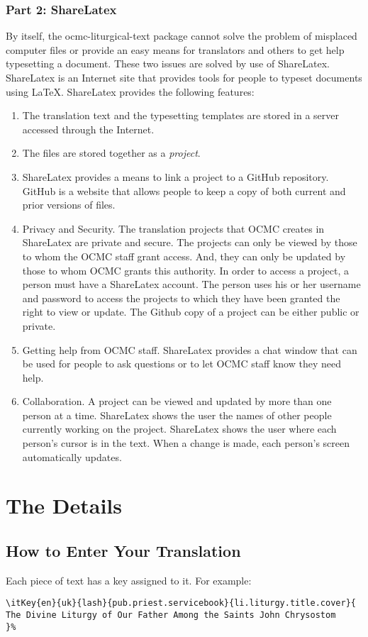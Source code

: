\documentclass[]{memoir}
\begin{document}
\subsection{Part 2: ShareLatex}
By itself, the ocmc-liturgical-text package cannot solve the problem of misplaced computer files or provide an easy means for translators and others to get help typesetting a document.  These two issues are solved by use of ShareLatex.  ShareLatex is an Internet site that provides tools for people to typeset documents using \LaTeX. ShareLatex provides the following features:
\begin{enumerate}
    \item The translation text and the typesetting templates are stored in a server accessed through the Internet.
    \item The files are stored together as a \textit{project}.
    \item ShareLatex provides a means to link a project to a GitHub repository.  GitHub is a website that allows people to keep a copy of both current and prior versions of files.  
    \item Privacy and Security.  The translation projects that OCMC creates in ShareLatex are private and secure.  The projects can only be viewed by those to whom the OCMC staff grant access.  And, they can only be updated by those to whom OCMC grants this authority. In order to access a project, a person must have a ShareLatex account.  The person uses his or her username and password to access the projects to which they have been granted the right to view or update.  The Github copy of a project can be either public or private.
    \item Getting help from OCMC staff.  ShareLatex provides a chat window that can be used for people to ask questions or to let OCMC staff know they need help.
    \item Collaboration.  A project can be viewed and updated by more than one person at a time.  ShareLatex shows the user the names of other people currently working on the project.  ShareLatex shows the user where each person's cursor is in the text.  When a change is made, each person's screen automatically updates.
\end{enumerate}
\chapter{The Details}
\section{How to Enter Your Translation}
Each piece of text has a key assigned to it.  For example:

\begin{verbatim}
\itKey{en}{uk}{lash}{pub.priest.servicebook}{li.liturgy.title.cover}{
The Divine Liturgy of Our Father Among the Saints John Chrysostom
}%

\end{verbatim}
\vfill

\pagebreak
\end{document}
